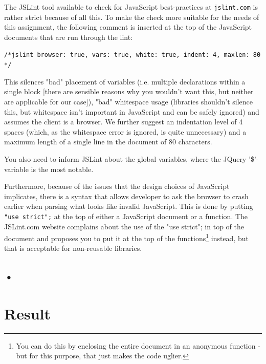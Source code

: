 \documentclass[a4paper]{scrartcl}
\begin{document}
The JSLint tool available to check for JavaScript best-practices at \texttt{jslint.com} is rather strict because of all this. To make the check more suitable for the needs of this assignment, the following comment is inserted at the top of the JavaScript documents that are run through the lint:

\texttt{/*jslint browser: true, vars: true, white: true, indent: 4, maxlen: 80 */}

This silences "bad" placement of variables (i.e. multiple declarations within a single block [there are sensible reasons why you wouldn't want this, but neither are applicable for our case]), "bad" whitespace usage (libraries shouldn't silence this, but whitespace isn't important in JavaScript and can be safely ignored) and assumes the client is a browser. We further suggest an indentation level of 4 spaces (which, as the whitespace error is ignored, is quite unnecessary) and a maximum length of a single line in the document of 80 characters.

You also need to inform JSLint about the global variables, where the JQuery '\$'-variable is the most notable.

Furthermore, because of the issues that the design choices of JavaScript implicates, there is a syntax that allows developer to ask the browser to crash earlier when parsing what looks like invalid JavaScript. This is done by putting \texttt{"use strict";} at the top of either a JavaScript document or a function. The JSLint.com website complains about the use of the "use strict"; in top of the document and proposes you to put it at the top of the functions\footnote{You can do this by enclosing the entire document in an anonymous function - but for this purpose, that just makes the code uglier.} instead, but that is acceptable for non-reusable libraries.

\subsection{•}

\section{Result}
\label{sec:results}
\end{document}
